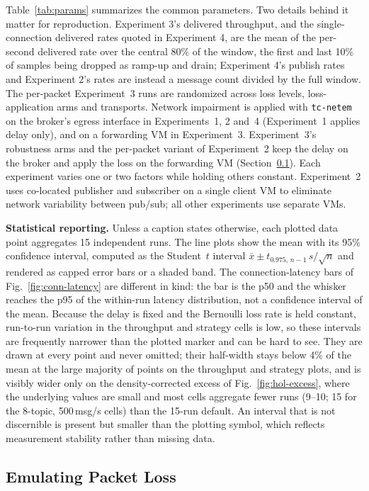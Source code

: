 \documentclass[a4paper,fleqn]{cas-dc}
\begin{document}
Table~\ref{tab:params} summarizes the common parameters. Two details behind it matter for reproduction. Experiment 3's delivered throughput, and the single-connection delivered rates quoted in Experiment 4, are the mean of the per-second delivered rate over the central 80\% of the window, the first and last 10\% of samples being dropped as ramp-up and drain; Experiment 4's publish rates and Experiment 2's rates are instead a message count divided by the full window. The per-packet Experiment~3 runs are randomized across loss levels, loss-application arms and transports. Network impairment is applied with \texttt{tc-netem} on the broker's egress interface in Experiments~1, 2 and~4 (Experiment~1 applies delay only), and on a forwarding VM in Experiment~3. Experiment~3's robustness arms and the per-packet variant of Experiment~2 keep the delay on the broker and apply the loss on the forwarding VM (Section~\ref{sec:loss-method}). Each experiment varies one or two factors while holding others constant. Experiment~2 uses co-located publisher and subscriber on a single client VM to eliminate network variability between pub/sub; all other experiments use separate VMs.

\textbf{Statistical reporting.} Unless a caption states otherwise, each plotted data point aggregates 15 independent runs. The line plots show the mean with its 95\% confidence interval, computed as the Student~$t$ interval $\bar{x}\pm t_{0.975,\,n-1}\,s/\sqrt{n}$ and rendered as capped error bars or a shaded band. The connection-latency bars of Fig.~\ref{fig:conn-latency} are different in kind: the bar is the p50 and the whisker reaches the p95 of the within-run latency distribution, not a confidence interval of the mean. Because the delay is fixed and the Bernoulli loss rate is held constant, run-to-run variation in the throughput and strategy cells is low, so these intervals are frequently narrower than the plotted marker and can be hard to see. They are drawn at every point and never omitted; their half-width stays below 4\% of the mean at the large majority of points on the throughput and strategy plots, and is visibly wider only on the density-corrected excess of Fig.~\ref{fig:hol-excess}, where the underlying values are small and most cells aggregate fewer runs (9--10; 15 for the 8-topic, 500\,msg/s cells) than the 15-run default. An interval that is not discernible is present but smaller than the plotting symbol, which reflects measurement stability rather than missing data.

\subsection{Emulating Packet Loss}
\label{sec:loss-method}
\end{document}
